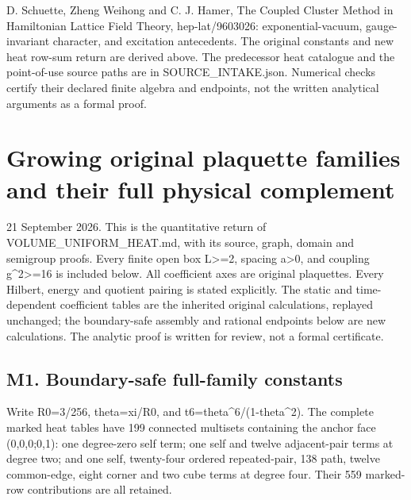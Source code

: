 \documentclass[11pt,a4paper]{article}
\let\originalsection\section
\renewcommand{\section}{\clearpage\originalsection}
\renewcommand{\[}{\begingroup\small\originaldisplaystart}
\renewcommand{\]}{\originaldisplayend\endgroup}
\begin{document}
D. Schuette, Zheng Weihong and C. J. Hamer, The Coupled Cluster Method
in Hamiltonian Lattice Field Theory, hep-lat/9603026:
exponential-vacuum, gauge-invariant character, and excitation
antecedents. The original constants and new heat row-sum return are
derived above. The predecessor heat catalogue and the point-of-use
source paths are in
{S\allowbreak{}O\allowbreak{}U\allowbreak{}R\allowbreak{}C\allowbreak{}E\allowbreak{}\_\allowbreak{}I\allowbreak{}N\allowbreak{}T\allowbreak{}A\allowbreak{}K\allowbreak{}E\allowbreak{}.\allowbreak{}j\allowbreak{}s\allowbreak{}o\allowbreak{}n\allowbreak{}.\allowbreak{}}
Numerical checks certify their declared finite algebra and endpoints,
not the written analytical arguments as a formal proof.

\section{Growing original plaquette families and their full physical
complement}\label{growing-original-plaquette-families-and-their-full-physical-complement}

21 September 2026. This is the quantitative return of
{V\allowbreak{}O\allowbreak{}L\allowbreak{}U\allowbreak{}M\allowbreak{}E\allowbreak{}\_\allowbreak{}U\allowbreak{}N\allowbreak{}I\allowbreak{}F\allowbreak{}O\allowbreak{}R\allowbreak{}M\allowbreak{}\_\allowbreak{}H\allowbreak{}E\allowbreak{}A\allowbreak{}T\allowbreak{}.\allowbreak{}m\allowbreak{}d\allowbreak{},\allowbreak{}}
with its source, graph, domain and semigroup proofs. Every finite open
box L\textgreater=2, spacing a\textgreater0, and coupling
g\^{}2\textgreater=16 is included below. All coefficient axes are
original plaquettes. Every Hilbert, energy and quotient pairing is
stated explicitly. The static and time-dependent coefficient tables are
the inherited original calculations, replayed unchanged; the
boundary-safe assembly and rational endpoints below are new
calculations. The analytic proof is written for review, not a formal
certificate.

\subsection{M1. Boundary-safe full-family
constants}\label{m1.-boundary-safe-full-family-constants}

Write R0=3/256, theta=xi/R0, and
{t\allowbreak{}6\allowbreak{}=\allowbreak{}t\allowbreak{}h\allowbreak{}e\allowbreak{}t\allowbreak{}a\allowbreak{}\textasciicircum{}\allowbreak{}6\allowbreak{}/\allowbreak{}(\allowbreak{}1\allowbreak{}-\allowbreak{}t\allowbreak{}h\allowbreak{}e\allowbreak{}t\allowbreak{}a\allowbreak{}\textasciicircum{}\allowbreak{}2\allowbreak{})\allowbreak{}.\allowbreak{}}
The complete marked heat tables have 199 connected multisets containing
the anchor face (0,0,0;0,1): one degree-zero self term; one self and
twelve adjacent-pair terms at degree two; and one self, twenty-four
ordered repeated-pair, 138 path, twelve common-edge, eight corner and
two cube terms at degree four. Their 559 marked-row contributions are
all retained.
\end{document}
